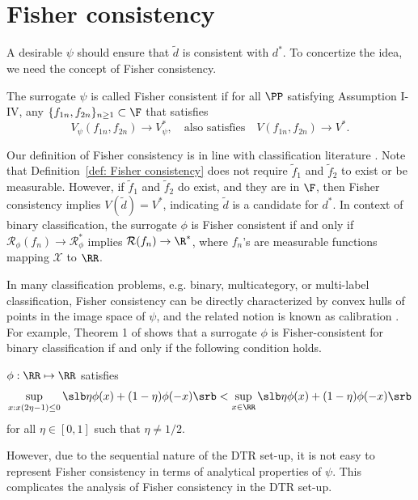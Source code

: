\documentclass[preprint] {imsart}
\begin{document}
 \section{Fisher consistency}
 \label{sec: concave}
A desirable  $\psi$ should ensure that $\tilde d$ is consistent with $d^*$. To concertize the idea, we need the concept of Fisher consistency.
\begin{definition}
\label{def: Fisher consistency}
The surrogate $\psi$ is called Fisher consistent if for all $\PP$ satisfying Assumption I-IV, any $\{f_{1n},f_{2n}\}_{n\geq 1}\subset \F$ that satisfies 
\[V_\psi(f_{1n},f_{2n})\to V_\psi^*,\quad\text{also satisfies}\quad V(f_{1n},f_{2n})\to V^*.\]
\end{definition}
 Our definition of Fisher consistency is in line with classification literature \citep{bartlett2006}. Note that Definition~\ref{def: Fisher consistency} does not require $\tilde f_1$ and $\tilde f_2$ to exist or be measurable. However, if $\tilde f_1$ and $\tilde f_2$ do exist, and they are in $\F$, {\color{black} then\label{page: FC def} Fisher consistency implies $V(\tilde d)=V^*$, indicating $\tilde d$ is a candidate for $d^*$.}
In context of binary classification, the surrogate $\phi$ is Fisher consistent if and only if $\mathcal R_\phi(f_n)\to \mathcal R_\phi^*$ implies $\mathcal R(f_n)\to \R^*$, where  $f_n$'s are measurable functions mapping $\mathcal X$ to $\RR$.

\begin{remark}
 In many classification problems, e.g. binary, multicategory, or multi-label classification, Fisher consistency can be directly characterized by  convex hulls of points in the image space of $\psi$, and the related notion is known as calibration \citep{bartlett2006, zhang2010, tewari2007, gao2011}. For example, Theorem 1 of \cite{bartlett2006} shows that a surrogate $\phi$ is Fisher-consistent for binary classification if and only if the following condition holds.
 \begin{condition}\label{cond: binary classification}
 $\phi:\RR\mapsto\RR$ satisfies
 \[ \sup_{x: x(2\eta-1)\leq 0}\slb \eta\phi(x)+(1-\eta)\phi(-x)\srb< \sup_{x\in\RR}\slb \eta\phi(x)+(1-\eta)\phi(-x)\srb\]
 for all $\eta\in[0,1]$ such that $\eta\neq 1/2$.
 \end{condition}
 However, due to the sequential nature of the DTR set-up,  it is not easy to represent Fisher consistency in terms of analytical properties of $\psi$. This complicates the analysis of Fisher consistency in the DTR set-up.
 \hfill\qedsymbol
\end{remark}
\end{document}
